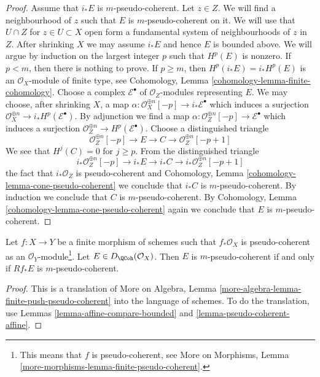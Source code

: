\begin{proof}
\medskip\noindent
Assume that $i_*E$ is $m$-pseudo-coherent. Let $z \in Z$.
We will find a neighbourhood of $z$ such that $E$
is $m$-pseudo-coherent on it. We will use
that $U \cap Z$ for $z \in U \subset X$ open form a fundamental system of
neighbourhoods of $z$ in $Z$. After shrinking $X$ we may assume $i_*E$
and hence $E$ is bounded above. We will argue by induction on
the largest integer $p$ such that $H^p(E)$ is nonzero. If $p < m$, then
there is nothing to prove. If $p \geq m$, then $H^p(i_*E) = i_*H^p(E)$
is an $\mathcal{O}_X$-module of finite type, see
Cohomology, Lemma \ref{cohomology-lemma-finite-cohomology}.
Choose a complex $\mathcal{E}^\bullet$ of $\mathcal{O}_Z$-modules
representing $E$. We may choose, after shrinking $X$,
a map $\alpha : \mathcal{O}_X^{\oplus n}[-p] \to i_*\mathcal{E}^\bullet$
which induces a surjection
$\mathcal{O}_X^{\oplus n} \to i_*H^p(\mathcal{E}^\bullet)$.
By adjunction we find a map
$\alpha : \mathcal{O}_Z^{\oplus n}[-p] \to \mathcal{E}^\bullet$
which induces a surjection
$\mathcal{O}_Z^{\oplus n} \to H^p(\mathcal{E}^\bullet)$.
Choose a distinguished triangle
$$
\mathcal{O}_Z^{\oplus n}[-p] \to E \to C \to \mathcal{O}_Z^{\oplus n}[-p + 1]
$$
We see that $H^j(C) = 0$ for $j \geq p$. From the distinguished triangle
$$
i_*\mathcal{O}_Z^{\oplus n}[-p] \to i_*E \to i_*C \to
i_*\mathcal{O}_Z^{\oplus n}[-p + 1]
$$
the fact that $i_*\mathcal{O}_Z$ is pseudo-coherent
and 
Cohomology, Lemma \ref{cohomology-lemma-cone-pseudo-coherent}
we conclude that $i_*C$ is $m$-pseudo-coherent.
By induction we conclude that $C$ is $m$-pseudo-coherent.
By Cohomology, Lemma \ref{cohomology-lemma-cone-pseudo-coherent}
again we conclude that $E$ is $m$-pseudo-coherent.
\end{proof}

\begin{lemma}
\label{lemma-finite-push-pseudo-coherent}
Let $f : X \to Y$ be a finite morphism of schemes such that
$f_*\mathcal{O}_X$ is pseudo-coherent as an
$\mathcal{O}_Y$-module\footnote{This means that $f$ is pseudo-coherent, see
More on Morphisms, Lemma
\ref{more-morphisms-lemma-finite-pseudo-coherent}.}.
Let $E \in D_\QCoh(\mathcal{O}_X)$. Then $E$ is $m$-pseudo-coherent
if and only if $Rf_*E$ is $m$-pseudo-coherent.
\end{lemma}

\begin{proof}
This is a translation of
More on Algebra, Lemma \ref{more-algebra-lemma-finite-push-pseudo-coherent}
into the language of schemes. To do the translation, use
Lemmas \ref{lemma-affine-compare-bounded} and
\ref{lemma-pseudo-coherent-affine}.
\end{proof}


